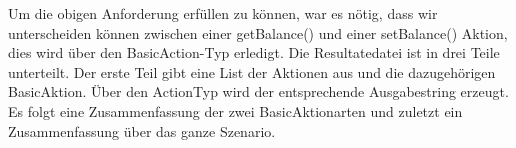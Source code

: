 Um die obigen Anforderung erfüllen zu können, war es nötig, dass wir unterscheiden können zwischen einer getBalance() und einer setBalance() Aktion, dies wird über den BasicAction-Typ erledigt.
\newline
Die Resultatedatei ist in drei Teile unterteilt. Der erste Teil gibt eine List der Aktionen aus und die dazugehörigen BasicAktion. Über den ActionTyp wird der entsprechende Ausgabestring erzeugt. Es folgt eine Zusammenfassung der zwei BasicAktionarten und zuletzt ein Zusammenfassung über das ganze Szenario.

